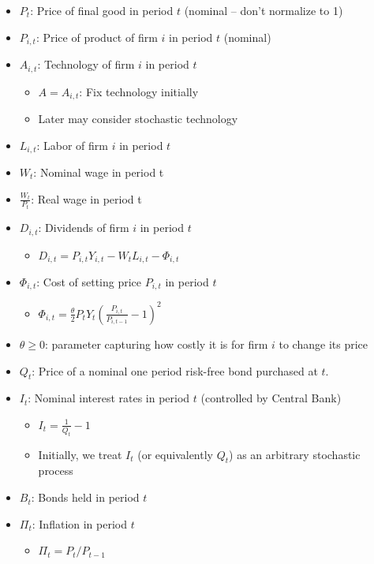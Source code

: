 \documentclass[10pt]{article}
\begin{document}
\begin{itemize}
    \item $P_t$: Price of final good in period $t$ (nominal -- don't normalize to 1)
    \item $P_{i,t}$: Price of product of firm $i$ in period $t$ (nominal)
    \item $A_{i,t}$: Technology of firm $i$ in period $t$
        \begin{itemize}
            \item $A = A_{i,t}$: Fix technology initially
            \item Later may consider stochastic technology
        \end{itemize}
    \item $L_{i, t}$: Labor of firm $i$ in period $t$
    \item $W_t$: Nominal wage in period t
    \item $\frac{W_t}{P_t}$: Real wage in period t
    \item $D_{i, t}$: Dividends of firm $i$ in period $t$
        \begin{itemize}
            \item $D_{i, t}=P_{i, t} Y_{i, t}-W_t L_{i, t}-\Phi_{i, t}$
        \end{itemize}
    \item $\Phi_{i, t}$: Cost of setting price $P_{i,t}$ in period $t$
        \begin{itemize}
            \item $\Phi_{i, t}=\frac{\theta}{2} P_t Y_t\left(\frac{P_{i, t}}{P_{i, t-1}}-1\right)^2$
        \end{itemize}
    \item $\theta \geq 0$: parameter capturing how costly it is for firm $i$ to change its price
    \item $Q_t$: Price of a nominal one period risk-free bond purchased at $t$.
    \item $I_t$: Nominal interest rates in period $t$ (controlled by Central Bank)
        \begin{itemize}
            \item $I_t=\frac{1}{Q_{t}}-1$
            \item Initially, we treat $I_t$ (or equivalently $Q_t$) as 
            an arbitrary stochastic process
        \end{itemize}
    \item $B_t$: Bonds held in period $t$
    \item $\Pi_t$: Inflation in period $t$
        \begin{itemize}
            \item $\Pi_t=P_t / P_{t-1}$
        \end{itemize}
\end{itemize}
\end{document}
